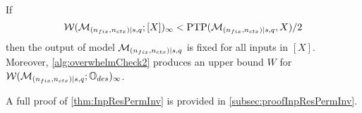 \begin{theorem} \label{thm:InpResPermInv}
	If
	\[
		\mathcal{W}(\mathcal{M}_{(n_{fix}, {n_{ctx}}) \mid {s}, q}; [X])_\infty < \mathrm{PTP}(\mathcal{M}_{(n_{fix}, {n_{ctx}}) \mid {s}, q}, X) / 2
	\]
	then the output of model $\mathcal{M}_{(n_{fix}, {n_{ctx}}) \mid {s}, q}$ is fixed for all inputs in $[X]$.
	Moreover, \cref{alg:overwhelmCheck2} produces an upper bound $W$ for $\mathcal{W}(\mathcal{M}_{(n_{fix}, {n_{ctx}}) \mid {s}, q}; \mathbb{O}_{des})_\infty$.
\end{theorem}
A full proof of \cref{thm:InpResPermInv} is provided in \cref{subsec:proofInpResPermInv}.
%
